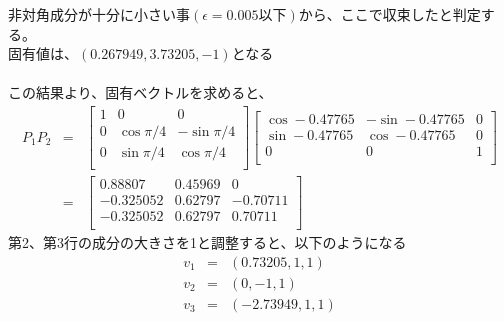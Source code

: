\documentclass[a4j,twoside,openright,11pt]{jsarticle}
\begin{document}
非対角成分が十分に小さい事$(\epsilon=0.005以下)$から、ここで収束したと判定する。\\
固有値は、$(0.267949,3.73205,-1)$となる\\
\\
この結果より、固有ベクトルを求めると、
\begin{eqnarray}
  P_1P_2 &=&  \left[
  \begin{array}{ccc}
  1&0&0\\
  0&\cos \pi/4 &-\sin \pi/4\\
  0&\sin \pi/4 &\cos \pi/4\\
  \end{array}
  \right]
  \left[
  \begin{array}{ccc}
  \cos -0.47765 &-\sin -0.47765&0\\
  \sin -0.47765 &\cos -0.47765&0\\
  0&0&1\\
  \end{array}
  \right]
\nonumber
\\
&=&   \left[
  \begin{array}{ccc}
0.88807   & 0.45969 & 0\\
-0.325052 & 0.62797 & -0.70711\\
-0.325052 & 0.62797 & 0.70711\\
  \end{array}
  \right]
\end{eqnarray}
第2、第3行の成分の大きさを1と調整すると、以下のようになる
\begin{eqnarray}
v_1&=&(0.73205,1,1)\nonumber\\
v_2&=&(0,-1,1)\nonumber\\
v_3&=&(-2.73949,1,1)\nonumber
\end{eqnarray}
\end{document}

